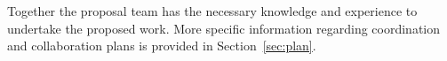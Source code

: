 
Together the proposal team has the necessary knowledge and experience to undertake the proposed work. 
More specific information regarding coordination and collaboration plans is
provided in Section~\ref{sec:plan}.
